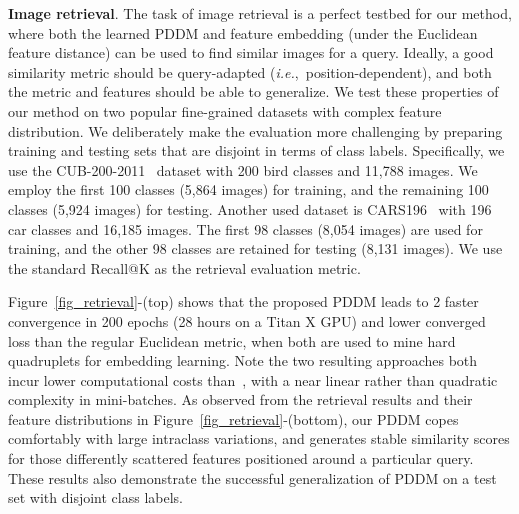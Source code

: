 \documentclass{article}
\newcommand{\ie}{\emph{i.e.}}
\begin{document}
\noindent \textbf{Image retrieval}.
The task of image retrieval is a perfect testbed for our method, where both the learned PDDM and feature embedding (under the Euclidean feature distance) can be used to find similar images for a query. Ideally, a good similarity metric should be query-adapted (\ie,~position-dependent), and both the metric and features should be able to generalize. We test these properties of our method on two popular fine-grained datasets with complex feature distribution.
We deliberately make the evaluation more challenging by preparing training and testing sets that are disjoint in terms of class labels. Specifically, we use the CUB-200-2011~\cite{WahCUB2002011} dataset with 200 bird classes and 11,788 images. We employ the first 100 classes (5,864 images) for training, and the remaining 100 classes (5,924 images) for testing. Another used dataset is CARS196~\cite{Krause2013} with 196 car classes and 16,185 images. The first 98 classes (8,054 images) are used for training, and the other 98 classes are retained for testing (8,131 images). We use the standard Recall@K as the retrieval evaluation metric.

Figure~\ref{fig_retrieval}-(top) shows that the proposed PDDM leads to 2 faster convergence in 200 epochs (28 hours on a Titan X GPU) and lower converged loss than the regular Euclidean metric, when both are used to mine hard quadruplets for embedding learning. Note the two resulting approaches both incur lower computational costs than~\cite{songCVPR16}, with a near linear rather than quadratic~\cite{songCVPR16} complexity in mini-batches. As observed from the retrieval results and their feature distributions in Figure~\ref{fig_retrieval}-(bottom), our PDDM copes comfortably with large intraclass variations, and generates stable similarity scores for those differently scattered features positioned around a particular query. These results also demonstrate the successful generalization of PDDM on a test set with disjoint class labels.
\end{document}
